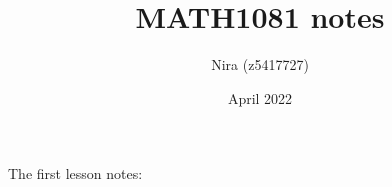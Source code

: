 \documentclass{article}
\title{MATH1081 notes}
\author{Nira (z5417727)}
\date{April 2022}
\begin{document}
\maketitle
The first lesson notes:
\end{document}
